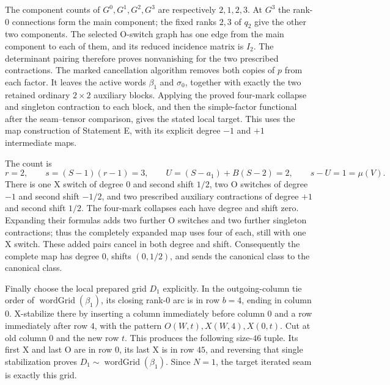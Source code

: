 \documentclass[11pt,a4paper]{article}
\theoremstyle{remark}
\begin{document}
The component counts of $G^0,G^1,G^2,G^3$ are respectively
$2,1,2,3$.  At $G^3$ the rank-$0$ connections form the main component;
the fixed ranks $2,3$ of $q_2$ give the other two components.  The
selected O-switch graph has one edge from the main component to each
of them, and its reduced incidence matrix is $I_2$.  The determinant
pairing therefore proves nonvanishing for the two prescribed
contractions.  The marked cancellation algorithm removes both copies
of $p$ from each factor.  It leaves the active words $\beta_1$ and
$\sigma_0$, together with exactly the two retained ordinary
$2\times2$ auxiliary blocks.  Applying the proved four-mark collapse
and singleton contraction to each block, and then the simple-factor
functional after the seam--tensor comparison, gives the stated local
target.  This uses the map construction of Statement E, with its
explicit degree $-1$ and $+1$ intermediate maps.

The count is
\[
 r=2,\qquad s=(S-1)(r-1)=3,\qquad
 U=(S-a_1)+B(S-2)=2,\qquad s-U=1=\mu(V).
\]
There is one X switch of degree $0$ and second shift $1/2$, two O
switches of degree $-1$ and second shift $-1/2$, and two prescribed
auxiliary contractions of degree $+1$ and second shift $1/2$.
The four-mark collapses each have degree and shift zero.  Expanding
their formulas adds two further O switches and two further singleton
contractions; thus the completely expanded map uses four of each,
still with one X switch.  These added pairs cancel in both degree
and shift.  Consequently
the complete map has degree $0$, shifts $(0,1/2)$, and sends the
canonical class to the canonical class.

Finally choose the local prepared grid $D_1$ explicitly.  In the
outgoing-column tie order of $\operatorname{wordGrid}(\beta_1)$,
its closing rank-$0$ arc is in row $b=4$, ending in column $0$.
X-stabilize there by inserting a column immediately before column
$0$ and a row immediately after row $4$, with the pattern
$O(W,t),X(W,4),X(0,t)$.  Cut at old column $0$ and the new row $t$.
This produces the following size-$46$ tuple.  Its first X and last O
are in row $0$, its last X is in row $45$, and reversing that single
stabilization proves $D_1\sim\operatorname{wordGrid}(\beta_1)$.
Since $N=1$, the target iterated seam is exactly this grid.
\end{document}
